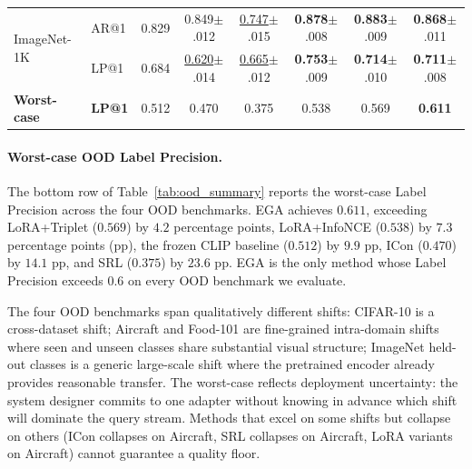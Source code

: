 \documentclass{article}
\begin{document}
\begin{table}[!t]
\begin{tabular}{llcccccc}
		\midrule
		\multirow{2}{*}{ImageNet-1K}
		                    & AR@1          & 0.829 & 0.849{\scriptsize$\pm$.012}             & \underline{0.747}{\scriptsize$\pm$.015} & \textbf{0.878}{\scriptsize$\pm$.008}    & \textbf{0.883}{\scriptsize$\pm$.009}    & \textbf{0.868}{\scriptsize$\pm$.011}    \\
		                    & LP@1          & 0.684 & \underline{0.620}{\scriptsize$\pm$.014} & \underline{0.665}{\scriptsize$\pm$.012} & \textbf{0.753}{\scriptsize$\pm$.009}    & \textbf{0.714}{\scriptsize$\pm$.010}    & \textbf{0.711}{\scriptsize$\pm$.008}    \\
		\midrule
		\textbf{Worst-case} & \textbf{LP@1} & 0.512 & 0.470                                   & 0.375                                   & 0.538                                   & 0.569                                   & \textbf{0.611}                          \\
		\bottomrule
	\end{tabular}
\end{table}

\paragraph{Worst-case OOD Label Precision.}
The bottom row of Table~\ref{tab:ood_summary} reports the worst-case Label Precision across the four OOD benchmarks.
EGA achieves $0.611$, exceeding LoRA+Triplet ($0.569$) by $4.2$ percentage points, LoRA+InfoNCE ($0.538$) by $7.3$ percentage points (pp), the frozen CLIP baseline ($0.512$) by $9.9$ pp, ICon ($0.470$) by $14.1$ pp, and SRL ($0.375$) by $23.6$ pp.
EGA is the only method whose Label Precision exceeds $0.6$ on every OOD benchmark we evaluate.

The four OOD benchmarks span qualitatively different shifts: CIFAR-10 is a cross-dataset shift; Aircraft and Food-101 are fine-grained intra-domain shifts where seen and unseen classes share substantial visual structure; ImageNet held-out classes is a generic large-scale shift where the pretrained encoder already provides reasonable transfer.
The worst-case reflects deployment uncertainty: the system designer commits to one adapter without knowing in advance which shift will dominate the query stream.
Methods that excel on some shifts but collapse on others (ICon collapses on Aircraft, SRL collapses on Aircraft, LoRA variants on Aircraft) cannot guarantee a quality floor.
\end{document}
